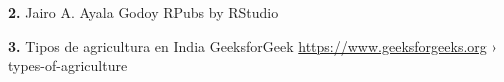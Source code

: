 \documentclass[oneside,11pt]{Latex/Classes/PhDthesisPSnPDF}
\begin{document}
\textbf{2.} Jairo A. Ayala Godoy RPubs by RStudio

\textbf{3.} Tipos de agricultura en India GeeksforGeek
\url{https://www.geeksforgeeks.org} › types-of-agriculture

\renewcommand{\bibname}{Lista de Referencias}
 
 

\end{document}
